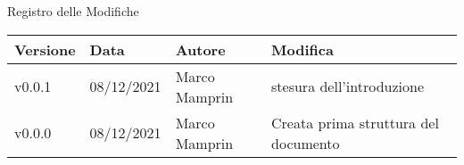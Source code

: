 \begin{center}
  \huge{Registro delle Modifiche}
\end{center}

\begin{center}
  \begin{tabular}{|p{2cm}|p{2cm}|p{3cm}|p{5cm}|}
    \hline
    \textbf{Versione} & \textbf{Data} & \textbf{Autore} & \textbf{Modifica}                    \\ \hline
    v0.0.1            & 08/12/2021    & Marco Mamprin   & stesura dell'introduzione \\ \hline
    v0.0.0            & 08/12/2021    & Marco Mamprin   & Creata prima struttura del documento \\ \hline
  \end{tabular}
\end{center}
